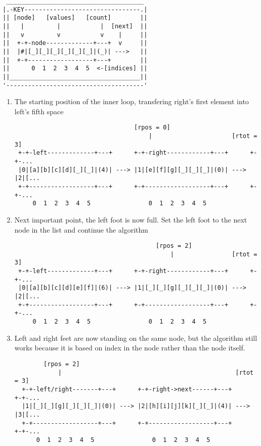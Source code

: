 \begin{verbatim}
 ______________________________________  
|.-KEY--------------------------------.| 
|| [node]   [values]   [count]        || 
||   |         |           |  [next]  || 
||   v         v           v    |     || 
||  +-+-node-------------+---+  v     || 
||  |#|[_][_][_][_][_][_]|(_)| --->   || 
||  +-+------------------+---+        || 
||      0  1  2  3  4  5  <-[indices] || 
||____________________________________|| 
'--------------------------------------' 
\end{verbatim}


\begin{enumerate}

	\item The starting position of the inner loop, transfering right's first
	      element into left's fifth space

	      \begin{verbatim}
                                 [rpos = 0]                           
                                     |                      [rtot = 3]
 +-+-left-------------+---+      +-+-right------------+---+      +-+-...
 |0|[a][b][c][d][_][_]|(4)| ---> |1|[e][f][g][_][_][_]|(0)| ---> |2|[...
 +-+------------------+---+      +-+------------------+---+      +-+-...
     0  1  2  3  4  5                0  1  2  3  4  5                 					
			 \end{verbatim}


	\item Next important point, the left foot is now full. Set the left foot
	      to the next node in the list and continue the algorithm
	      \begin{verbatim}
                                       [rpos = 2]                     
                                           |                [rtot = 3]
 +-+-left-------------+---+      +-+-right------------+---+      +-+-...
 |0|[a][b][c][d][e][f]|(6)| ---> |1|[_][_][g][_][_][_]|(0)| ---> |2|[... 
 +-+------------------+---+      +-+------------------+---+      +-+-...				
     0  1  2  3  4  5                0  1  2  3  4  5                 				
			 \end{verbatim}


	\item Left and right feet are now standing on the same node, but the
	      algorithm still works because it is based on index in the node
	      rather than the node itself.
	      \begin{verbatim}
        [rpos = 2]                                                     
            |                                                [rtot = 3]
  +-+-left/right-------+---+      +-+-right->next------+---+      +-+-... 
  |1|[_][_][g][_][_][_]|(0)| ---> |2|[h][i][j][k][_][_]|(4)| ---> |3|[... 					
  +-+------------------+---+      +-+------------------+---+      +-+-...					
      0  1  2  3  4  5                0  1  2  3  4  5                 				
		\end{verbatim}



\end{enumerate}
